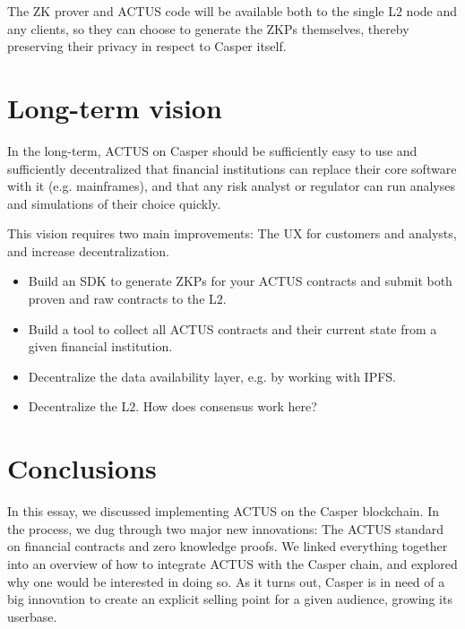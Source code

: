 \documentclass[12pt]{article}
\def\bi{\begin{itemize}}
\def\ei{\end{itemize}}
\begin{document}
The ZK prover and ACTUS code will be available both to the single L$2$ node and
any clients, so they can choose to generate the ZKPs themselves, thereby
preserving their privacy in respect to Casper itself.


\section{Long-term vision} \label{vision}

In the long-term, ACTUS on Casper should be sufficiently easy to use and
sufficiently decentralized that financial institutions can replace their core
software with it (e.g. mainframes), and that any risk analyst or regulator can
run analyses and simulations of their choice quickly.

This vision requires two main improvements: The UX for customers and
analysts, and increase decentralization.
\bi
  \item Build an SDK to generate ZKPs for your ACTUS contracts and submit both
    proven and raw contracts to the L$2$.
  \item Build a tool to collect all ACTUS contracts and their current state from
    a given financial institution.
  \item Decentralize the data availability layer, e.g. by working with IPFS.
  \item Decentralize the L$2$. How does consensus work here?
\ei



\section{Conclusions}


In this essay, we discussed implementing ACTUS on the Casper blockchain. In the
process, we dug through two major new innovations: The ACTUS standard on
financial contracts and zero knowledge proofs. We linked everything together
into an overview of how to integrate ACTUS with the Casper chain, and explored
why one would be interested in doing so. As it turns out, Casper is in need of a
big innovation to create an explicit selling point for a given audience, growing
its userbase.

\end{document}
